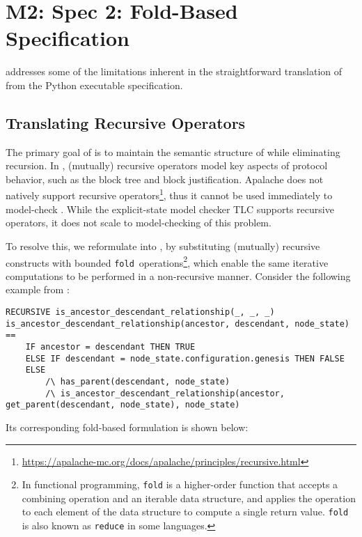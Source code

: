 
\section{M2: Spec 2: Fold-Based Specification}

\SpecTwo{} addresses some of the limitations inherent in the straightforward
translation of \SpecOne{} from the Python executable specification.

\subsection{Translating Recursive \tlap{} Operators}

The primary goal of \SpecTwo{} is to maintain the semantic structure of
\SpecOne{} while eliminating recursion. In \SpecOne{}, (mutually) recursive
operators model key aspects of protocol behavior, such as the block tree and
block justification. Apalache does not natively support recursive
operators\footnote{\url{https://apalache-mc.org/docs/apalache/principles/recursive.html}},
thus it cannot be used immediately to model-check \SpecOne{}. While the
explicit-state \tlap{} model checker TLC supports recursive operators, it does
not scale to model-checking of this problem.

To resolve this, we reformulate \SpecOne{} into \SpecTwo{}, by substituting
(mutually) recursive constructs with bounded
\texttt{fold}~operations\footnote{In functional programming, \texttt{fold} is a
higher-order function that accepts a combining operation and an iterable data
structure, and applies the operation to each element of the data structure
to compute a single return value. \texttt{fold} is also known as
\texttt{reduce} in some languages.}, which enable the same iterative
computations to be performed in a non-recursive manner. Consider the following
example from \SpecOne{}:

\begin{lstlisting}[language=tla]
RECURSIVE is_ancestor_descendant_relationship(_, _, _)
is_ancestor_descendant_relationship(ancestor, descendant, node_state) ==
    IF ancestor = descendant THEN TRUE
    ELSE IF descendant = node_state.configuration.genesis THEN FALSE
    ELSE
        /\ has_parent(descendant, node_state)
        /\ is_ancestor_descendant_relationship(ancestor, get_parent(descendant, node_state), node_state)
\end{lstlisting}

Its corresponding fold-based formulation is shown below:

